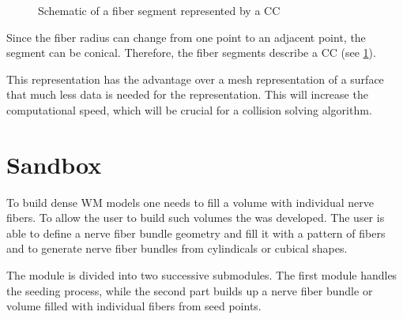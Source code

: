 %
\begin{figure}[!t]
    \centering
    \setlength{\tikzwidth}{0.5\textwidth}
	\caption{Schematic of a fiber segment represented by a   \ac{CC}}
	\label{fig:conical}
\end{figure}
%
Since the fiber radius can change from one point to an adjacent point, the segment can be conical.
Therefore, the fiber segments describe a \ac{CC} (see \cref{fig:conical}).
\par
%
This representation has the advantage over a mesh representation of a surface that much less data is needed for the representation.
This will increase the computational speed, which will be crucial for a collision solving algorithm.
%
% 
% 
\section{Sandbox}\label{sec:sandbox}
%
To build dense \ac{WM} models one needs to fill a volume with individual nerve fibers.
To allow the user to build such volumes the  was developed.
The user is able to define a nerve fiber bundle geometry and fill it with a pattern of fibers and to generate nerve fiber bundles from cylindicals or cubical shapes.
\par
%
The  module is divided into two successive submodules.
The first module handles the seeding process, while the second part builds up a nerve fiber bundle or volume filled with individual fibers from seed points.
%
% 
% 
